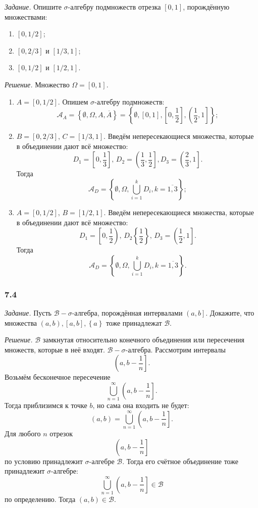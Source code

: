 \textit{Задание.} Опишите $ \sigma $-алгебру подмножеств отрезка $ \left[ 0, 1 \right] $, порождённую множествами:
\begin{enumerate}[label=\alph*)]
\item $ \left[ 0, 1/2 \right] $;
\item $ \left[ 0, 2/3 \right] $ и $ \left[ 1/3, 1 \right] $;
\item $ \left[ 0, 1/2 \right] $ и $ \left[ 1/2,  1 \right] $.
\end{enumerate}

\textit{Решение.} Множество $ \Omega = \left[ 0, 1 \right] $.

\begin{enumerate}[label=\alph*)]
\item $A = \left[ 0, 1/2 \right] $.
Опишем $ \sigma $-алгебру подмножеств:
$$ \mathcal{A}_A =
\left\{ \emptyset, \Omega, A, \overline{A} \right\} =
\left\{ \emptyset, \left[ 0, 1 \right], \left[ 0, \frac{1}{2} \right], \left( \frac{1}{2}, 1 \right] \right\};$$
\item $B = \left[ 0, 2/3 \right], \, C = \left[ 1/3, 1 \right] $.
Введём непересекающиеся множества, которые в объединении дают всё множество:
$$D_1 =
\left[ 0, \frac{1}{3} \right], \,
D_2 =
\left( \frac{1}{3}, \frac{1}{2} \right],
D_3 =
\left( \frac{2}{3}, 1 \right].$$
Тогда
$$ \mathcal{A}_D =
\left\{ \emptyset, \Omega, \bigcup \limits_{i=1}^k D_i, k = \overline{1,3} \right\};$$
\item $A = \left[ 0, 1/2 \right], \, B = \left[ 1/2,  1 \right] $.
Введём непересекающиеся множества, которые в объединении дают всё множество:
$$D_1 =
\left[ 0, \frac{1}{2} \right), \,
D_2 \left\{ \frac{1}{2} \right\}, \,
D_3 = \left( \frac{1}{2}, 1 \right].$$
Тогда
$$ \mathcal{A}_D =
\left\{ \emptyset, \Omega, \bigcup \limits_{i=1}^k D_i, k = \overline{1,3} \right\}.$$
\end{enumerate}

\subsubsection*{7.4}

\textit{Задание.} Пусть $ \mathcal{B} - \sigma $-алгебра, порождённая интервалами $ \left( a, b \right] $.
Докажите, что множества $ \left( a, b \right), \left[ a, b \right], \left\{ a \right\} $ тоже принадлежат $ \mathcal{B} $.

\textit{Решение.} $ \mathcal{B} $ замкнутая относительно конечного объединения или пересечения множеств, которые в неё входят.
$ \mathcal{B} - \sigma $-алгебра.
Рассмотрим интервалы
$$ \left( a, b - \frac{1}{n} \right].$$
Возьмём бесконечное пересечение
$$ \bigcup \limits_{n=1}^{ \infty } \left( a, b - \frac{1}{n} \right].$$
Тогда приблизимся к точке $b$, но сама она входить не будет:
$$ \left( a, b \right) =
\bigcup \limits_{n=1}^{ \infty } \left( a, b - \frac{1}{n} \right].$$
Для любого $n$ отрезок
$$ \left( a, b - \frac{1}{n} \right] $$
по условию принадлежит $ \sigma $-алгебре $ \mathcal{B}$.
Тогда его счётное объединение тоже принадлежит $ \sigma $-алгебре:
$$ \bigcup \limits_{n=1}^{ \infty } \left( a, b - \frac{1}{n} \right] \in \mathcal{B} $$
по определению.
Тогда $ \left( a, b \right) \in \mathcal{B} $.


